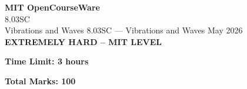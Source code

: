 \documentclass[12pt,a4paper]{exam}
\begin{document}
\begin{center}
{\LARGE \textbf{MIT OpenCourseWare}}\\8.03SC\\Vibrations and Waves
\vspace{0.5cm}
{8.03SC} --- {Vibrations and Waves}
\vspace{0.3cm}
May 2026
\vspace{0.3cm}
\textbf{EXTREMELY HARD -- MIT LEVEL}
\end{center}

\begin{center}
\textbf{Time Limit: 3 hours}
\end{center}

\begin{center}
\textbf{Total Marks: 100}
\end{center}

\vspace{0.5cm}
\end{document}
